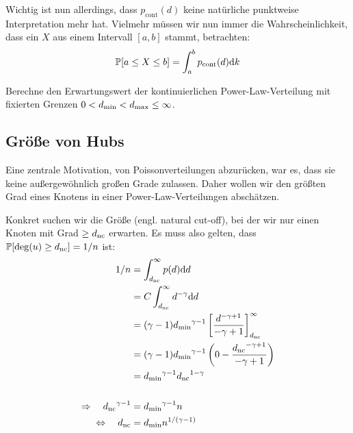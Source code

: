 Wichtig ist nun allerdings, dass $p_{\text{cont}}(d)$ keine natürliche punktweise Interpretation mehr hat.
Vielmehr müssen wir nun immer die Wahrscheinlichkeit, dass ein $X$ aus einem Intervall $[a, b]$ stammt, betrachten:
\begin{equation}
    \mathbb{P}\!\left[a \le X \le b\right] = \int_{a}^b p_{\text{cont}}(d) \text d k
\end{equation}

\begin{exercise}
    Berechne den Erwartungswert der kontinuierlichen Power-Law-Verteilung mit fixierten Grenzen $0 < {d_{\text{min}}} < {d_{\text{max}}} \le \infty$.
\end{exercise}

\subsection{Größe von Hubs}\label{subsec:groesse_von_hubs}
Eine zentrale Motivation, von Poissonverteilungen abzurücken, war es, dass sie keine außergewöhnlich großen Grade zulassen.
Daher wollen wir den größten Grad eines Knotens in einer Power-Law-Verteilungen abschätzen.

Konkret suchen wir die Größe \dnc{} (engl. natural cut-off), bei der wir nur einen Knoten mit Grad $\ge {d_{\text{nc}}}$ erwarten.
Es muss also gelten, dass $\mathbb{P}\!\left[\deg(u) \ge {d_{\text{nc}}}\right] = 1 / n$ ist:
\begin{align}
    1/n                                & = \int_{{d_{\text{nc}}}}^\infty p(d) \text d d                                                               \\
                                       & = C \int_{{d_{\text{nc}}}}^\infty d^{-\gamma} \text d d                                                      \\
                                       & = (\gamma-1) {d_{\text{min}}}^{\gamma - 1} \left[ \frac{d^{-\gamma + 1}}{-\gamma +1} \right]_{{d_{\text{nc}}}}^\infty \\
                                       & = (\gamma-1) {d_{\text{min}}}^{\gamma - 1} \left( 0 - \frac{{d_{\text{nc}}}^{-\gamma + 1}}{-\gamma +1} \right)      \\
                                       & = {d_{\text{min}}}^{\gamma - 1} {d_{\text{nc}}}^{1 - \gamma}                                                        \\
    \nonumber                                                                                                                          \\
    \Rightarrow\quad {d_{\text{nc}}}^{\gamma - 1} & = {d_{\text{min}}}^{\gamma - 1} n                                                                        \\
    \Leftrightarrow\quad {d_{\text{nc}}}          & = {d_{\text{min}}} n^{1/(\gamma - 1)}
\end{align}

